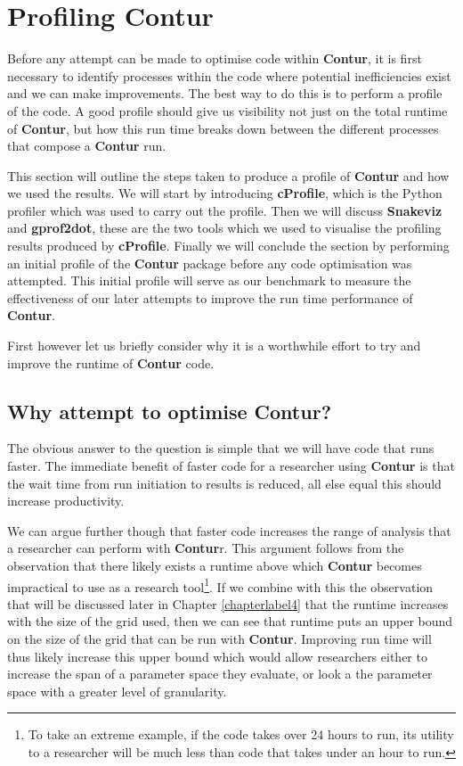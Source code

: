 \chapter{Profiling Contur}
\label{chapterlabel3}

Before any attempt can be made to optimise code within \textbf{Contur}, it is first necessary to identify processes within the code where potential inefficiencies exist and we can make improvements. The best way to do this is to perform a profile of the code. A good profile should give us visibility not just on the total runtime of \textbf{Contur}, but how this run time breaks down between the different processes that compose a \textbf{Contur} run. 

This section will outline the steps taken to produce a profile of \textbf{Contur} and how we used the results. We will start by introducing \textbf{cProfile}, which is the Python profiler which was used to carry out the profile. Then we will discuss \textbf{Snakeviz} and \textbf{gprof2dot}, these are the two tools which we used to visualise the profiling results produced by \textbf{cProfile}. Finally we will conclude the section by performing an initial profile of the \textbf{Contur} package before any code optimisation was attempted. This initial profile will serve as our benchmark to measure the effectiveness of our later attempts to improve the run time performance of \textbf{Contur}.

First however let us briefly consider why it is a worthwhile effort to try and improve the runtime of \textbf{Contur} code.

\section{Why attempt to optimise Contur?}
The obvious answer to the question  is simple that we will have code that runs faster. The immediate benefit of faster code for a researcher using \textbf{Contur} is that the wait time from run initiation to results is reduced, all else equal this should increase productivity.

We can argue further though that faster code increases the range of analysis that a researcher can perform with \textbf{Contur}r. This argument follows from the observation that there likely exists a runtime above which \textbf{Contur} becomes impractical to use as a research tool\footnote{To take an extreme example, if the code takes over 24 hours to run, its utility to a researcher will be much less than code that takes under an hour to run.}. If we combine with this the observation that will be discussed later in Chapter \ref{chapterlabel4} that the runtime increases with the size of the grid used, then we can see that runtime puts an upper bound on the size of the grid that can be run with \textbf{Contur}. Improving run time will thus likely increase this upper bound which would allow researchers either to increase the span of a parameter space they evaluate, or look a the parameter space with a greater level of granularity.

